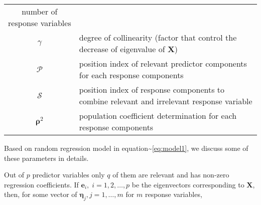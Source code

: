 \documentclass[12pt,A4paper,authoryear]{elsarticle} %
\begin{document}
\begin{longtable}[]{@{}cl@{}}
\begin{minipage}[t]{0.75\columnwidth}
number of response variables\strut
\end{minipage}\tabularnewline
\begin{minipage}[t]{0.19\columnwidth}\centering\strut
\(\gamma\)\strut
\end{minipage} & \begin{minipage}[t]{0.75\columnwidth}\raggedright\strut
degree of collinearity (factor that control the decrease of eigenvalue
of \(\mathbf{X}\))\strut
\end{minipage}\tabularnewline
\begin{minipage}[t]{0.19\columnwidth}\centering\strut
\(\mathcal{P}\)\strut
\end{minipage} & \begin{minipage}[t]{0.75\columnwidth}\raggedright\strut
position index of relevant predictor components for each response
components\strut
\end{minipage}\tabularnewline
\begin{minipage}[t]{0.19\columnwidth}\centering\strut
\(\mathcal{S}\)\strut
\end{minipage} & \begin{minipage}[t]{0.75\columnwidth}\raggedright\strut
position index of response components to combine relevant and irrelevant
response variable\strut
\end{minipage}\tabularnewline
\begin{minipage}[t]{0.19\columnwidth}\centering\strut
\(\boldsymbol{\rho}^2\)\strut
\end{minipage} & \begin{minipage}[t]{0.75\columnwidth}\raggedright\strut
population coefficient determination for each response components\strut
\end{minipage}\tabularnewline
\bottomrule
\end{longtable}

Based on random regression model in
equation\textasciitilde{}\eqref{eq:model1}, we discuss some of these
parameters in details.

Out of \(p\) predictor variables only \(q\) of them are relevant and has
non-zero regression coefficients. If
\(\boldsymbol{e}_i, \; i = 1, 2, \ldots, p\) be the eigenvectors
corresponding to \(\mathbf{X}\), then, for some vector of
\(\boldsymbol{\eta}_j, j = 1, \ldots, m\) for \(m\) response variables,
\end{document}

